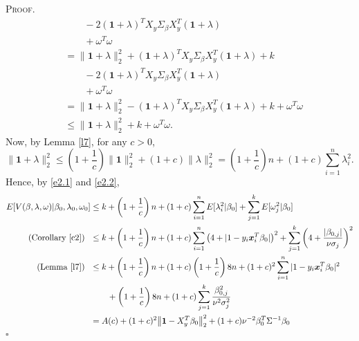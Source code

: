 \documentclass[12pt]{article}
\newcounter{ProofCounter}
\newenvironment{Proof}{\stepcounter{ProofCounter}\textsc{Proof.}}{\hfill$\square$}
\numberwithin{equation}{section}
\begin{document}
\begin{Proof}
\begin{align}
      & \qquad - 2(\bm{1} +\lambda)^T X_y\Sigma_{\beta}X_y^T(\bm{1} + \lambda) \nonumber\\
      & \qquad + \omega^T \omega \nonumber\\
      & = \big\| \bm{1} + \lambda\big\|_2^2 + (\bm{1} + \lambda)^T X_y \Sigma_{\beta} X_y^T (\bm{1} + \lambda) + k \nonumber\\  
      & \qquad - 2(\bm{1} +\lambda)^T X_y\Sigma_{\beta}X_y^T(\bm{1} + \lambda) \nonumber\\
      & \qquad + \omega^T \omega \nonumber\\
      & = \big\| \bm{1} + \lambda\big\|_2^2 - (\bm{1} + \lambda)^T X_y \Sigma_{\beta} X_y^T (\bm{1} + \lambda) + k + \omega^T \omega \nonumber\\
      & \leq \big\| \bm{1} + \lambda\big\|_2^2 + k + \omega^T \omega. 
      \label{e2.2}
  \end{align}
  Now, by Lemma \ref{l7}, for any $c > 0$,
  \[
    \big\| \bm{1} + \lambda \big\|_2^2 \leq \left( 1 + \frac{1}{c} \right)\|\bm{1}\|_2^2 + (1 + c)\|\lambda\|_2^2 = \left( 1 + \frac{1}{c} \right)n +
    (1 + c) \sum_{i=1}^{n}\lambda_i^2.
  \]
  Hence, by \eqref{e2.1} and \eqref{e2.2},
  \begin{align*}
    E[ V(\beta, \lambda, \omega) | \beta_0, \lambda_0, \omega_0] & \leq k + \left( 1 + \frac{1}{c} \right)n + (1 + c) \sum_{i=1}^{n}E[\lambda_i^2 |
    \beta_0] + \sum_{j=1}^{k} E[\omega_j^2 | \beta_0] \\
    \text{(Corollary \ref{c2}) } \ & \leq k + \left( 1 + \frac{1}{c} \right)n + (1 + c) \sum_{i=1}^{n}\left( 4 + |1 - y_i \bm{x}_i^T \beta_0| \right)^2 + 
    \sum_{j=1}^{k} \left( 4 + \frac{|\beta_{0,j}|}{\nu \sigma_j} \right)^2 \\
    \text{(Lemma \ref{l7}) } \ & \leq k + \left( 1 + \frac{1}{c} \right)n + (1 + c)\left(1 + \frac{1}{c}\right) 8n + (1+c)^2\sum_{i=1}^{n}|1 -
    y_i\bm{x}_i^T\beta_0|^2 \\
    & \qquad + \left( 1 + \frac{1}{c} \right)8n + (1 + c)\sum_{j=1}^{k} \frac{\beta_{0,j}^2}{\nu^2\sigma_j^2} \\
    & = A(c) + (1 + c)^2 \big\| \bm{1} - X_y^T \beta_0 \big\|_2^2 + (1 + c) \nu^{-2} \beta_0^T \Sigma^{-1} \beta_0
  \end{align*}
\end{Proof}


\newpage
\end{document}
